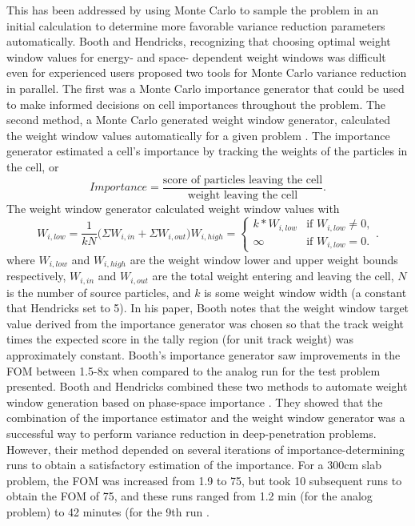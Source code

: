 This has been addressed by using Monte Carlo to sample the problem in an initial
calculation to determine more favorable variance reduction parameters automatically.
Booth and Hendricks,
recognizing that choosing optimal weight window values for energy- and space-
dependent weight windows was difficult even for experienced users proposed two
tools for Monte Carlo variance reduction in parallel. The first was a
Monte Carlo importance generator \cite{booth_automatic_1982} that could be used
to make informed decisions on cell importances throughout the problem. The
second method, a Monte Carlo generated weight window generator,
calculated the weight window values automatically for a given problem
\cite{hendricks_code-generated_1982}.
The importance generator estimated a cell's importance
by tracking the weights of the particles in the cell, or
\begin{equation}
  Importance  = \frac{\text{score of particles leaving the cell}}
                     {\text{weight leaving the cell}}.
\label{eq:BoothImp}
\end{equation}
The weight window generator calculated weight window values with
\begin{subequations}
\begin{equation}
  W_{i,low} = \frac{1}{kN}\big(\Sigma W_{i,in} + \Sigma W_{i,out} \big)
\end{equation}
\begin{equation}
  W_{i,high} =
  \begin{cases}
    k*W_{i,low} & \text{if } W_{i,low} \neq 0, \\
    \infty & \text{if } W_{i,low} = 0.
  \end{cases}  .
  \label{eq:hendricksWW}
\end{equation}
\end{subequations}
where $W_{i,low}$ and $W_{i,high}$ are the weight window lower and upper weight
bounds respectively, $W_{i,in}$ and $W_{i,out}$ are the total weight entering
and leaving the cell, $N$ is the number of source particles, and $k$ is some weight
window width (a constant that Hendricks set to 5). In his
paper, Booth notes that the weight window target value derived from the
importance generator was chosen so that the
track weight times the expected score in the tally region (for unit track
weight) was approximately constant. Booth's importance generator saw
improvements in the FOM between 1.5-8x when compared to the analog run for the
test problem presented. Booth and Hendricks combined these two methods to
automate weight window generation based on phase-space importance
\cite{booth_deep_1982, booth_importance_1984}. They showed that the combination
of the importance estimator and the weight window generator was a successful way
to perform variance reduction in deep-penetration problems. However, their
method depended on several iterations of importance-determining runs to obtain a
satisfactory estimation of the importance. For a 300cm slab problem, the FOM was
increased from 1.9 to 75, but took 10 subsequent runs to obtain the FOM of 75,
and these runs ranged from 1.2 min (for the analog problem) to 42 minutes (for
the 9th run \cite{booth_importance_1984}.

